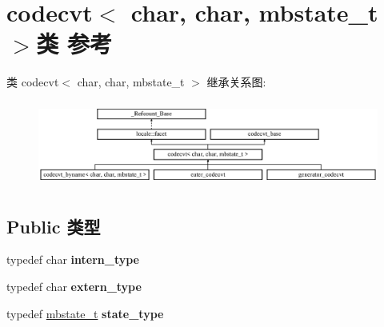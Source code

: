 \hypertarget{classcodecvt_3_01char_00_01char_00_01mbstate__t_01_4}{}\section{codecvt$<$ char, char, mbstate\+\_\+t $>$类 参考}
\label{classcodecvt_3_01char_00_01char_00_01mbstate__t_01_4}
类 codecvt$<$ char, char, mbstate\+\_\+t $>$ 继承关系图\+:\begin{figure}[H]
\begin{center}
\leavevmode
\includegraphics[height=2.849873cm]{classcodecvt_3_01char_00_01char_00_01mbstate__t_01_4}
\end{center}
\end{figure}
\subsection*{Public 类型}
\begin{DoxyCompactItemize}
\item 
\mbox{\label{classcodecvt_3_01char_00_01char_00_01mbstate__t_01_4_ac3444610831ca0f36bf46b2301dc6b1d}} 
typedef char {\bfseries intern\+\_\+type}
\item 
\mbox{\label{classcodecvt_3_01char_00_01char_00_01mbstate__t_01_4_a9d3ddc33061e293d1011551e3013a337}} 
typedef char {\bfseries extern\+\_\+type}
\item 
\mbox{\label{classcodecvt_3_01char_00_01char_00_01mbstate__t_01_4_ad4f291e5c9f9d76560417103461c2caf}} 
typedef \hyperlink{struct____mbstate__t}{mbstate\+\_\+t} {\bfseries state\+\_\+type}
\end{DoxyCompactItemize}
